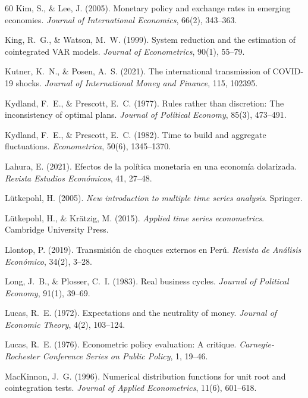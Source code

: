 \documentclass[12pt,a4paper]{article}
\begin{document}
\begin{thebibliography}{60}
 Kim, S., \& Lee, J. (2005). Monetary policy and exchange rates in emerging economies. \textit{Journal of International Economics}, 66(2), 343--363.

 King, R.~G., \& Watson, M.~W. (1999). System reduction and the estimation of cointegrated VAR models. \textit{Journal of Econometrics}, 90(1), 55--79.

 Kutner, K.~N., \& Posen, A.~S. (2021). The international transmission of COVID-19 shocks. \textit{Journal of International Money and Finance}, 115, 102395.

 Kydland, F.~E., \& Prescott, E.~C. (1977). Rules rather than discretion: The inconsistency of optimal plans. \textit{Journal of Political Economy}, 85(3), 473--491.

 Kydland, F.~E., \& Prescott, E.~C. (1982). Time to build and aggregate fluctuations. \textit{Econometrica}, 50(6), 1345--1370.

 Lahura, E. (2021). Efectos de la política monetaria en una economía dolarizada. \textit{Revista Estudios Económicos}, 41, 27--48.

 Lütkepohl, H. (2005). \textit{New introduction to multiple time series analysis}. Springer.

 Lütkepohl, H., \& Krätzig, M. (2015). \textit{Applied time series econometrics}. Cambridge University Press.

 Llontop, P. (2019). Transmisión de choques externos en Perú. \textit{Revista de Análisis Económico}, 34(2), 3--28.

 Long, J.~B., \& Plosser, C.~I. (1983). Real business cycles. \textit{Journal of Political Economy}, 91(1), 39--69.

 Lucas, R.~E. (1972). Expectations and the neutrality of money. \textit{Journal of Economic Theory}, 4(2), 103--124.

 Lucas, R.~E. (1976). Econometric policy evaluation: A critique. \textit{Carnegie-Rochester Conference Series on Public Policy}, 1, 19--46.

 MacKinnon, J.~G. (1996). Numerical distribution functions for unit root and cointegration tests. \textit{Journal of Applied Econometrics}, 11(6), 601--618.


\end{thebibliography}
\end{document}
